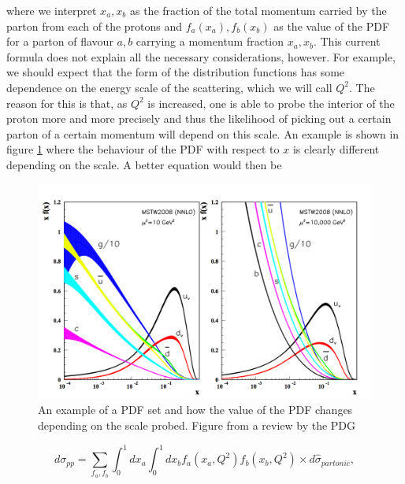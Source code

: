 where we interpret $x_a, x_b$ as the fraction of the total momentum carried by the parton from each of the protons and $f_a (x_a), f_b(x_b)$ as the value of the PDF for a parton of flavour $a,b$ carrying a momentum fraction $x_a, x_b$. This current formula does not explain all the necessary considerations, however. For example, we should expect that the form of the distribution functions has some dependence on the energy scale of the scattering, which we will call $Q^2$. The reason for this is that, as $Q^2$ is increased, one is able to probe the interior of the proton more and more precisely and thus the likelihood of picking out a certain parton of a certain momentum will depend on this scale. An example is shown in figure \ref{fig:PDF} where the behaviour of the PDF with respect to $x$ is clearly different depending on the scale. A better equation would then be

\begin{figure}[t]
\centering
\includegraphics[scale=0.7]{Images/PDF.png} 
\caption{An example of a PDF set and how the value of the PDF changes depending on the scale probed. Figure from a review by the PDG \cite{PDG}}
\label{fig:PDF}
\end{figure}

\begin{equation}
d \sigma_{pp} = \sum_{f_a, f_b} \int_0^1 dx_a \int_0^1 dx_b f_a(x_a, Q^2) f_b(x_b, Q^2) \times d\hat{\sigma}_{partonic},
\end{equation}

